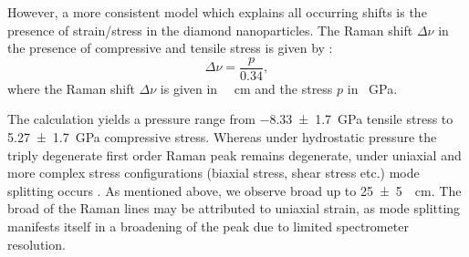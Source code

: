 % 
% 
				However, a more consistent model which explains all occurring shifts is the presence of strain/stress in the diamond nanoparticles. The Raman shift $\Delta \nu$ in the presence of compressive and tensile stress is given by \cite{Widmann2016,Liscia2013a}: 
				\begin{equation}
					\Delta \nu = \frac{p}{0.34},
				\end{equation}
				where the Raman shift $\Delta\nu$ is given in \SI{}{\per\centi\meter} and the stress $p$ in \SI{}{\giga\pascal}. 

				The calculation yields a pressure range from \SI[separate-uncertainty]{-8.33+-1.7}{\giga\pascal} tensile stress to \SI[separate-uncertainty]{5.27+-1.7}{\giga\pascal} compressive stress. Whereas under hydrostatic pressure the triply degenerate first order Raman peak remains degenerate, under uniaxial and more complex stress configurations (biaxial stress, shear stress etc.) mode splitting occurs \cite{Prawer2004}. As mentioned above, we observe broad \lws up to \SI[separate-uncertainty]{25+-5}{\per\centi\meter}.
				The broad \lws of the Raman lines may be attributed to uniaxial strain, as mode splitting manifests itself in a broadening of the peak due to limited spectrometer resolution.

